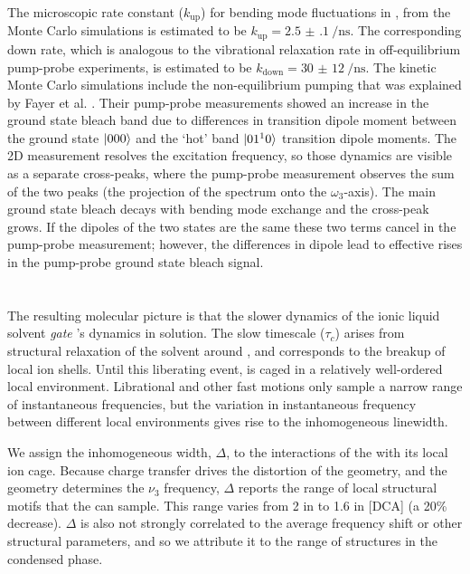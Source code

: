 \documentclass[%
  class = book,%
  crop = false,%
  float = true,%
  multi = true,%
  preview = false,%
]{standalone}
\begin{document}
{The microscopic rate constant (\(k_{\mathrm{up}}\)) for  bending mode fluctuations in \ce{[Im_{4,1}][TfO]}, from the Monte Carlo simulations is estimated to be \(k_{\mathrm{up}} = \SI{2.5(1)}{\per\ns}\). The corresponding down rate, which is analogous to the vibrational relaxation rate in off-equilibrium pump-probe experiments, is estimated to be \(k_{\mathrm{down}} = \SI{30(12)}{\per\ns}\). The kinetic Monte Carlo simulations include the non-equilibrium pumping that was explained by Fayer et al. \cite{Giammanco2016}. Their pump-probe measurements showed an increase in the ground state bleach band due to differences in transition dipole moment between the ground state \(\ket{000}\) and the `hot' band \(\ket{01^10}\) transition dipole moments. The 2D measurement resolves the excitation frequency, so those dynamics are visible as a separate cross-peaks, where the pump-probe measurement observes the sum of the two peaks (the projection of the spectrum onto the \(\omega_3\)-axis). The main ground state bleach decays with bending mode exchange and the cross-peak grows. If the dipoles of the two states are the same these two terms cancel in the pump-probe measurement; however, the differences in dipole lead to effective rises in the pump-probe ground state bleach signal.

\section{\texorpdfstring{}{Molecular Interpretation}}
\label{sec:anions_interpretation}

The resulting molecular picture is that the slower dynamics of the ionic liquid solvent \textit{gate} 's dynamics in solution. The slow timescale (\(\tau_c\)) arises from structural relaxation of the solvent around , and corresponds to the breakup of local ion shells. Until this liberating event,  is caged in a relatively well-ordered local environment. Librational and other fast motions only sample a narrow range of instantaneous frequencies, but the variation in instantaneous frequency between different local environments gives rise to the inhomogeneous linewidth.

We assign the inhomogeneous width, \(\Delta\), to the interactions of the  with its local ion cage. Because charge transfer drives the distortion of the  geometry, and the geometry determines the \(\nu_3\) frequency, \(\Delta\) reports the range of local structural motifs that the  can sample.
This range varies from \SI{2}{\wavenumber} in \ce{[PF6]} to \SI{1.6}{\wavenumber} in [DCA]  (a 20\% decrease). \(\Delta\) is also not strongly correlated to the average frequency shift or other structural parameters, and so we attribute it to the range of structures in the condensed phase.

}
\end{document}
